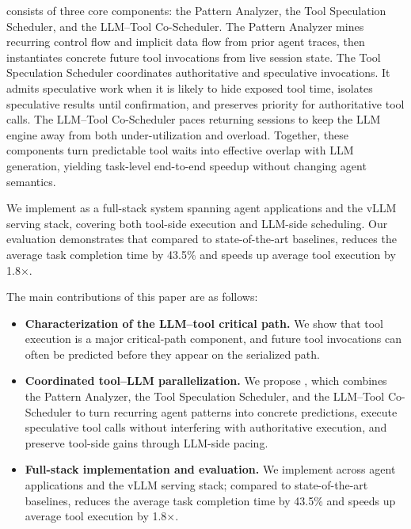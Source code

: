 \sys consists of three core components: the Pattern Analyzer, the Tool Speculation Scheduler, and the LLM--Tool Co-Scheduler. The Pattern Analyzer mines recurring control flow and implicit data flow from prior agent traces, then instantiates concrete future tool invocations from live session state. The Tool Speculation Scheduler coordinates authoritative and speculative invocations. It admits speculative work when it is likely to hide exposed tool time, isolates speculative results until confirmation, and preserves priority for authoritative tool calls. The LLM--Tool Co-Scheduler paces returning sessions to keep the LLM engine away from both under-utilization and overload. Together, these components turn predictable tool waits into effective overlap with LLM generation, yielding task-level end-to-end speedup without changing agent semantics.

We implement \sys as a full-stack system spanning agent applications and the vLLM serving stack, covering both tool-side execution and LLM-side scheduling. Our evaluation demonstrates that compared to state-of-the-art baselines, \sys reduces the average task completion time by 43.5\% and speeds up average tool execution by 1.8$\times$.

The main contributions of this paper are as follows:

\begin{itemize}[itemsep=0pt, parsep=2pt, labelsep=5pt, leftmargin=*, topsep=2pt,partopsep=2pt]
\item \textbf{Characterization of the LLM--tool critical path.} We show that tool execution is a major critical-path component, and future tool invocations can often be predicted before they appear on the serialized path.
\item \textbf{Coordinated tool--LLM parallelization.} We propose \sys, which combines the Pattern Analyzer, the Tool Speculation Scheduler, and the LLM--Tool Co-Scheduler to turn recurring agent patterns into concrete predictions, execute speculative tool calls without interfering with authoritative execution, and preserve tool-side gains through LLM-side pacing.
\item \textbf{Full-stack implementation and evaluation.} We implement \sys across agent applications and the vLLM serving stack; compared to state-of-the-art baselines, \sys reduces the average task completion time by 43.5\% and speeds up average tool execution by 1.8$\times$.
\end{itemize}
